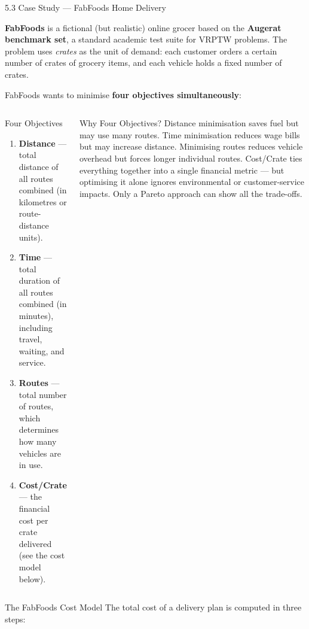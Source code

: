 \documentclass[aspectratio=169,10pt]{beamer}
\begin{document}
\begin{frame}[allowframebreaks]{5.3 Case Study — FabFoods Home Delivery}

  \textbf{FabFoods} is a fictional (but realistic) online grocer based on the
  \textbf{Augerat benchmark set}, a standard academic test suite for VRPTW
  problems.  The problem uses \emph{crates} as the unit of demand: each
  customer orders a certain number of crates of grocery items, and each
  vehicle holds a fixed number of crates.

  FabFoods wants to minimise \textbf{four objectives simultaneously}:

  \begin{columns}[t]
    \begin{block}{Four Objectives}
      \begin{enumerate}
        \item \textbf{Distance} — total distance of all routes combined
              (in kilometres or route-distance units).
        \item \textbf{Time} — total duration of all routes combined
              (in minutes), including travel, waiting, and service.
        \item \textbf{Routes} — total number of routes, which determines
              how many vehicles are in use.
        \item \textbf{Cost/Crate} — the financial cost per crate delivered
              (see the cost model below).
      \end{enumerate}
    \end{block}

    \begin{alertblock}{Why Four Objectives?}
      Distance minimisation saves fuel but may use many routes.  Time
      minimisation reduces wage bills but may increase distance.  Minimising
      routes reduces vehicle overhead but forces longer individual routes.
      Cost/Crate ties everything together into a single financial metric —
      but optimising it alone ignores environmental or customer-service
      impacts.  Only a Pareto approach can show all the trade-offs.
    \end{alertblock}
  \end{columns}

\framebreak

  \begin{block}{The FabFoods Cost Model}
    The total cost of a delivery plan is computed in three steps:


\end{block}
\end{frame}
\end{document}
